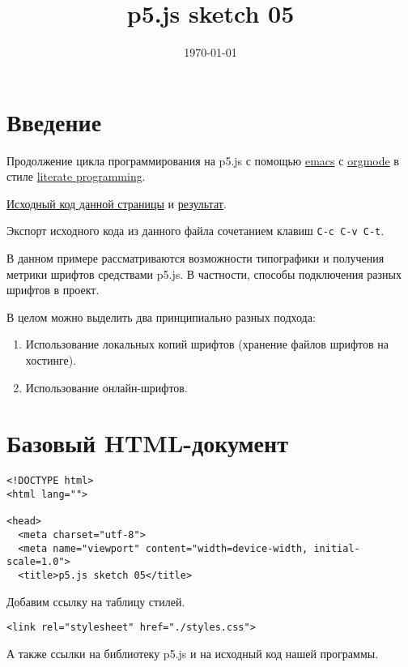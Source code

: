 \documentclass[11pt]{scrartcl}
\date{\today}
\title{p5.js sketch 05}
\begin{document}
\maketitle
\setcounter{tocdepth}{6}
\tableofcontents

\section{Введение}
\label{sec:org2e0b15d}

Продолжение цикла программирования на p5.js с помощью \href{https://www.gnu.org/software/emacs/}{emacs} с \href{https://orgmode.org/}{orgmode} в стиле \href{http://www.literateprogramming.com/}{literate programming}.

\href{./sketch\_05.org}{Исходный код данной страницы} и \href{../index.html}{результат}. 

Экспорт исходного кода из данного файла сочетанием клавиш \texttt{C-c C-v C-t}.

В данном примере рассматриваются возможности типографики и получения метрики шрифтов средствами p5.js. В частности, способы подключения разных шрифтов в проект.

В целом можно выделить два принципиально разных подхода:
\begin{enumerate}
\item Использование локальных копий шрифтов (хранение файлов шрифтов на хостинге).
\item Использование онлайн-шрифтов.
\end{enumerate}

\section{Базовый HTML-документ}
\label{sec:org3c8d846}

\begin{verbatim}
<!DOCTYPE html>
<html lang="">

<head>
  <meta charset="utf-8">
  <meta name="viewport" content="width=device-width, initial-scale=1.0">
  <title>p5.js sketch 05</title>
\end{verbatim}

Добавим ссылку на таблицу стилей.

\begin{verbatim}
<link rel="stylesheet" href="./styles.css">
\end{verbatim}

А также ссылки на библиотеку p5.js и на исходный код нашей программы.
\end{document}

